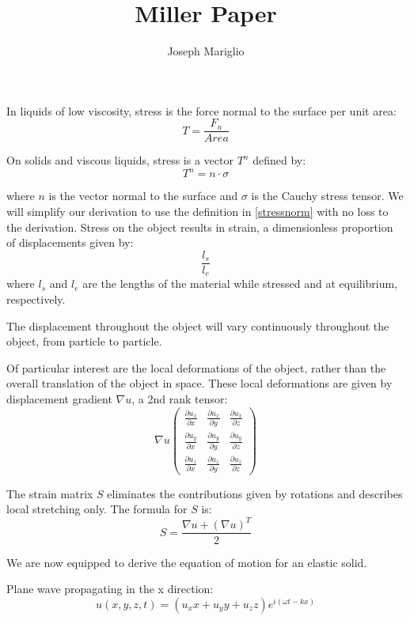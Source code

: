 \documentclass[a4paper,10pt, twocolumn]{report}
\title{Miller Paper}
\author{Joseph Mariglio}
\begin{document}
\maketitle

\begin{abstract}
\end{abstract}

In liquids of low viscosity, stress is the force normal to the surface per unit area:
\begin{equation}\label{stressnorm}
T = \frac{F_n}{Area}
\end{equation}

On solids and viscous liquids, stress is a vector $T^n$ defined by:
\begin{equation}\label{stressvec}
T^n = n  \cdot \sigma
\end{equation}

where $n$ is the vector normal to the surface and $\sigma$ is the Cauchy stress tensor. 
We will simplify our derivation to use the definition in \eqref{stressnorm} with no loss to the derivation.
Stress on the object results in strain, a dimensionless proportion of displacements given by:
\begin{equation}
\frac{l_{s}}{l_{e}}
\end{equation}
where $l_s$ and $l_e$ are the lengths of the material while stressed and at equilibrium, respectively.

The displacement throughout the object will vary continuously throughout the object, from particle to particle.

Of particular interest are the local deformations of the object, rather than the overall translation of the object in space.
These local deformations are given by displacement gradient $\nabla u$, a 2nd rank tensor:
\begin{equation}
\nabla u \begin{pmatrix}
         \frac{\partial u_x}{\partial x} & \frac{\partial u_x}{\partial y} & \frac{\partial u_x}{\partial z} \\[0.5em]
         \frac{\partial u_y}{\partial x} & \frac{\partial u_y}{\partial y} & \frac{\partial u_y}{\partial z} \\[0.5em]
         \frac{\partial u_z}{\partial x} & \frac{\partial u_z}{\partial y} & \frac{\partial u_z}{\partial z}
        \end{pmatrix}
\end{equation}

The strain matrix $S$ eliminates the contributions given by rotations and describes local stretching only. 
The formula for $S$ is:
\begin{equation}
S = \frac{\nabla u + \left(\nabla u \right)^T}{2}
\end{equation}

We are now equipped to derive the equation of motion for an elastic solid.

Plane wave propagating in the x direction:
\begin{equation}\label{planewave}
u(x,y,z,t) = (u_x x + u_y y + u_z z) e^{i(\omega t - k x)}
\end{equation}



\nocite{*}
\end{document}
